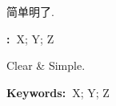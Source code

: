 \newpage
\pagestyle{empty}
\setcounter{page}{1}



简单明了.

\textbf{:~}X; Y; Z

\newpage



Clear \& Simple.

\noindent\textbf{Keywords:~}X; Y; Z